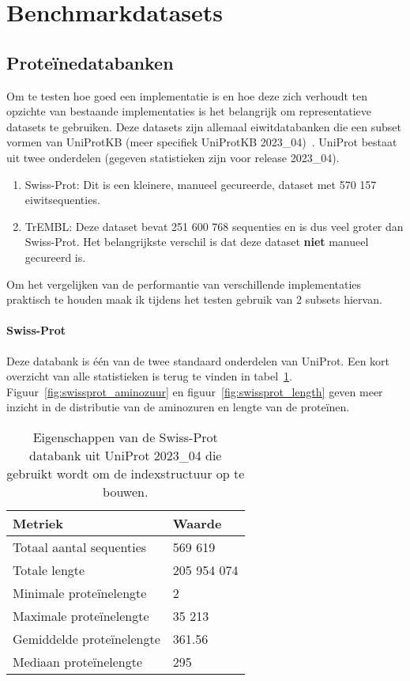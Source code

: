 \section{Benchmarkdatasets}\label{sec:datasets}

\subsection{Proteïnedatabanken}\label{subsec:proteine-databanken}
Om te testen hoe goed een implementatie is en hoe deze zich verhoudt ten opzichte van bestaande implementaties is het belangrijk om representatieve datasets te gebruiken.
Deze datasets zijn allemaal eiwitdatabanken die een subset vormen van UniProtKB (meer specifiek UniProtKB 2023\_04)~\cite{UniprotKB}.
UniProt bestaat uit twee onderdelen (gegeven statistieken zijn voor release 2023\_04).
\begin{enumerate}
    \item Swiss-Prot: Dit is een kleinere, manueel gecureerde, dataset met 570 157 eiwitsequenties.
    \item TrEMBL: Deze dataset bevat 251 600 768 sequenties en is dus veel groter dan Swiss-Prot.
    Het belangrijkste verschil is dat deze dataset \textbf{niet} manueel gecureerd is.
\end{enumerate}
Om het vergelijken van de performantie van verschillende implementaties praktisch te houden maak ik tijdens het testen gebruik van 2 subsets hiervan.

\paragraph{Swiss-Prot} Deze databank is één van de twee standaard onderdelen van UniProt.
Een kort overzicht van alle statistieken is terug te vinden in tabel~\ref{tab:swissprot_eigenschappen}.
Figuur~\ref{fig:swissprot_aminozuur} en figuur~\ref{fig:swissprot_length} geven meer inzicht in de distributie van de aminozuren en lengte van de proteïnen.

\begin{table}[h!]
    \centering
    \begin{tabular}{l l}
        Metriek                   & Waarde      \\
        \hline\hline
        Totaal aantal sequenties  & 569 619     \\
        Totale lengte             & 205 954 074 \\
        Minimale proteïnelengte   & 2           \\
        Maximale proteïnelengte   & 35 213      \\
        Gemiddelde proteïnelengte & 361.56      \\
        Mediaan proteïnelengte    & 295         \\
        \hline
    \end{tabular}
    \caption{Eigenschappen van de Swiss-Prot databank uit UniProt 2023\_04 die gebruikt wordt om de indexstructuur op te bouwen.}
    \label{tab:swissprot_eigenschappen}
\end{table}


